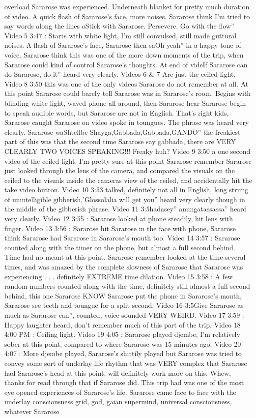 \documentclass[12pt]{book}
\begin{document}
overload Sararose was experienced. Underneath blanket for pretty much duration of video. A quick flash of Sararose's face, more noises, Sararose think I'm tried to say words along the lines oStick with Sararose. Persevere. Go with the flow'' Video 5 3:47 : Starts with white light, I'm still convulsed, still made guttural noises. A flash of Sararose's face, Sararose then saOh yeah'' in a happy tone of voice. Sararose think this was one of the more down moments of the trip, when Sararose could kind of control Sararose's thoughts. At end of videIf Sararose can do Sararose, do it'' heard very clearly. Videos 6 \& 7 Are just the ceiled light. Video 8 3:50 this was one of the only videos Sararose do not remember at all. At this point Sararose could barely tell Sararose was in Sararose's room. Begins with blinding white light, waved phone all around, then Sararose hear Sararose begin to speak audible words, but Sararose are not in English. That's right kids, Sararose caught Sararose on video spoke in toungues. The phrase was heard very clearly. Sararose waShtellbe Shayga,Gabbada,Gabbada,GANDO'' the freakiest part of this was that the second time Sararose say gabbada, there are VERY CLEARLY TWO VOICES SPEAKING!!! Freaky huh? Video 9 3:50 a one second video of the ceiled light. I'm pretty sure at this point Sararose remember Sararose just looked through the lens of the camera, and compared the visuals on the ceiled to the visuals inside the cameras view of the ceiled, and accidentally hit the take video button. Video 10 3:53 talked, definitely not all in English, long strung of unintelligible gibberish,'Glossolalia will get you'' heard very clearly though in the middle of the gibberish phrase. Video 11 3:5hadasey'' anungatassassa'' heard very clearly. Video 12 3:55 : Sararose looked at phone steadily, hit lens with finger. Video 13 3:56 : Sararose hit Sararose in the face with phone, Sararose think Sararose had Sararose in Sararose's mouth too. Video 14 3:57 : Sararose counted along with the timer on the phone, but almost a full second behind. Time had no meant at this point. Sararose remember looked at the time several times, and was amazed by the complete slowness of Sararose that Sararose was experiencing . . . definitely EXTREME time dilation. Video 15 3:58 : A few random numbers counted along with the time, definitely still almost a full second behind, this one Sararose KNOW Sararose put the phone in Sararose's mouth, Sararose see teeth and toungue for a split second. Video 16 3:5Give Sararose as much as Sararose can'', counted, voice sounded VERY WEIRD. Video 17 3:59 : Happy laughter heard, don't remember much of this part of the trip. Video 18 4:00 PM : Ceiling light. Video 19 4:05 : Sararose played djembe, I'm relatively sober at this point, compared to where Sararose was 15 minutes ago. Video 20 4:07 : More djembe played, Sararose's shittily played but Sararose was tried to convey some sort of underlay life rhythm that was VERY complex that Sararose had Sararose's head at this point, will definitely work more on this. Whew, thanks for read through that if Sararose did. This trip had was one of the most eye opened experiences of Sararose's life. Sararose came face to face with the underlay consciousness grid, god, gaian supermind, universal consciousness, whatever Sararose 
\end{document}
